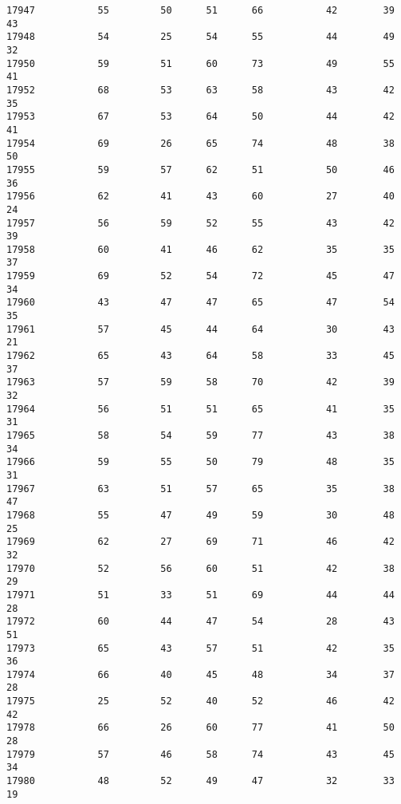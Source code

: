 \documentclass[11pt]{article}
\begin{document}
\begin{verbatim}
17947           55         50      51      66           42        39       43   
17948           54         25      54      55           44        49       32   
17950           59         51      60      73           49        55       41   
17952           68         53      63      58           43        42       35   
17953           67         53      64      50           44        42       41   
17954           69         26      65      74           48        38       50   
17955           59         57      62      51           50        46       36   
17956           62         41      43      60           27        40       24   
17957           56         59      52      55           43        42       39   
17958           60         41      46      62           35        35       37   
17959           69         52      54      72           45        47       34   
17960           43         47      47      65           47        54       35   
17961           57         45      44      64           30        43       21   
17962           65         43      64      58           33        45       37   
17963           57         59      58      70           42        39       32   
17964           56         51      51      65           41        35       31   
17965           58         54      59      77           43        38       34   
17966           59         55      50      79           48        35       31   
17967           63         51      57      65           35        38       47   
17968           55         47      49      59           30        48       25   
17969           62         27      69      71           46        42       32   
17970           52         56      60      51           42        38       29   
17971           51         33      51      69           44        44       28   
17972           60         44      47      54           28        43       51   
17973           65         43      57      51           42        35       36   
17974           66         40      45      48           34        37       28   
17975           25         52      40      52           46        42       42   
17978           66         26      60      77           41        50       28   
17979           57         46      58      74           43        45       34   
17980           48         52      49      47           32        33       19   


\end{verbatim}
\end{document}
